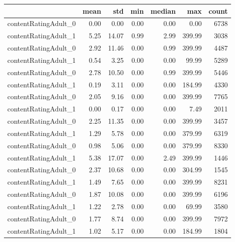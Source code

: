 \begin{tabular}{lrrrrrr}
\toprule
{} &  mean &   std &  min &  median &    max &  count \\
\midrule
contentRatingAdult\_0 & 0.00 & 0.00 & 0.00 & 0.00 & 0.00 &  6738 \\
contentRatingAdult\_1 & 5.25 & 14.07 & 0.99 & 2.99 & 399.99 &  3038 \\
contentRatingAdult\_0 & 2.92 & 11.46 & 0.00 & 0.99 & 399.99 &  4487 \\
contentRatingAdult\_1 & 0.54 & 3.25 & 0.00 & 0.00 & 99.99 &  5289 \\
contentRatingAdult\_0 & 2.78 & 10.50 & 0.00 & 0.99 & 399.99 &  5446 \\
contentRatingAdult\_1 & 0.19 & 3.11 & 0.00 & 0.00 & 184.99 &  4330 \\
contentRatingAdult\_0 & 2.05 & 9.16 & 0.00 & 0.00 & 399.99 &  7765 \\
contentRatingAdult\_1 & 0.00 & 0.17 & 0.00 & 0.00 & 7.49 &  2011 \\
contentRatingAdult\_0 & 2.25 & 11.35 & 0.00 & 0.00 & 399.99 &  3457 \\
contentRatingAdult\_1 & 1.29 & 5.78 & 0.00 & 0.00 & 379.99 &  6319 \\
contentRatingAdult\_0 & 0.98 & 5.06 & 0.00 & 0.00 & 379.99 &  8330 \\
contentRatingAdult\_1 & 5.38 & 17.07 & 0.00 & 2.49 & 399.99 &  1446 \\
contentRatingAdult\_0 & 2.37 & 10.68 & 0.00 & 0.00 & 304.99 &  1545 \\
contentRatingAdult\_1 & 1.49 & 7.65 & 0.00 & 0.00 & 399.99 &  8231 \\
contentRatingAdult\_0 & 1.87 & 10.08 & 0.00 & 0.00 & 399.99 &  6196 \\
contentRatingAdult\_1 & 1.22 & 2.78 & 0.00 & 0.00 & 69.99 &  3580 \\
contentRatingAdult\_0 & 1.77 & 8.74 & 0.00 & 0.00 & 399.99 &  7972 \\
contentRatingAdult\_1 & 1.02 & 5.17 & 0.00 & 0.00 & 184.99 &  1804 \\
\bottomrule
\end{tabular}
